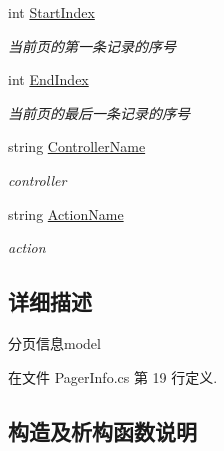 \begin{DoxyCompactItemize}
int \hyperlink{class_x_c_l_net_tools_1_1_entity_1_1_pager_info_a659b36bf635a3fed41ee3b82ec4c2cbe}{Start\+Index}
\begin{DoxyCompactList}\small\item\em 当前页的第一条记录的序号 \end{DoxyCompactList}\item 
int \hyperlink{class_x_c_l_net_tools_1_1_entity_1_1_pager_info_a9d9af42d4a2c5da6386e089dbb1d33ea}{End\+Index}
\begin{DoxyCompactList}\small\item\em 当前页的最后一条记录的序号 \end{DoxyCompactList}\item 
string \hyperlink{class_x_c_l_net_tools_1_1_entity_1_1_pager_info_a7684b1dd21faadcf80c1e2d081660569}{Controller\+Name}
\begin{DoxyCompactList}\small\item\em controller \end{DoxyCompactList}\item 
string \hyperlink{class_x_c_l_net_tools_1_1_entity_1_1_pager_info_aa3c26ca4634e5ab5023cc0157e3245b7}{Action\+Name}
\begin{DoxyCompactList}\small\item\em action \end{DoxyCompactList}\end{DoxyCompactItemize}


\subsection{详细描述}
分页信息model 



在文件 Pager\+Info.\+cs 第 19 行定义.



\subsection{构造及析构函数说明}
